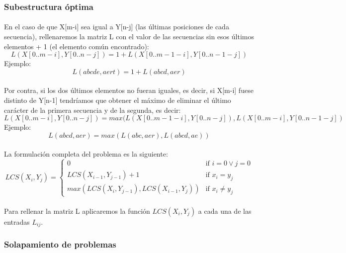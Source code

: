 \documentclass{article}
\begin{document}
		\subsubsection{Subestructura óptima}

			\paragraph{}
			En el caso de que X[m-i] sea igual a Y[n-j] (las últimas posiciones de cada secuencia), rellenaremos la matriz L con el valor de las secuencias sin esos últimos elementos + 1 (el elemento común encontrado):
			\[
			L(X[0..m-i], Y[0..n-j]) = 1 + L(X[0..m-1-i], Y[0..n-1-j])
			\]
			\newline{}
			Ejemplo:
			\[
			L(abcde, aert) = 1 + L(abcd, aer)
			\]

			\paragraph{}
			Por contra, si los dos últimos elementos no fueran iguales, es decir, si X[m-i] fuese distinto de Y[n-1] tendríamos que obtener el máximo de eliminar el último carácter de la primera secuencia y de la segunda, es decir:
			\[
			L(X[0..m-i], Y[0..n-j]) = max(L(X[0..m-1-i], Y[0..n-j]), L(X[0..m-i], Y[0..n-1-j])
			\]
			\newline{}
			Ejemplo:
			\[
			L(abcd, aer) = max( L(abc, aer), L(abcd, ae) )
			\]

			\paragraph{}
			La formulación completa del problema es la siguiente:
			\[
   			 LCS( X_{i}, Y_{j} ) =
				\begin{cases}
				    	0									& \text{if } i = 0 \vee	 j = 0\\
    					LCS( X_{i-1}, Y_{j-1}) + 1					& \text{if } x_{i} = y_{j}\\
    					max(LCS( X_{i}, Y_{j-1}), LCS( X_{i-1}, Y_{j}))	& \text{if } x_{i} \not = y_{j}
				\end{cases}
			\]

			\paragraph{}
			Para rellenar la matriz L aplicaremos la función $LCS( X_{i}, Y_{j} )$ a cada una de las entradas $L_{ij}$.

		\subsubsection{Solapamiento de problemas}
\end{document}

